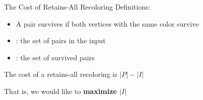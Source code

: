 \begin{frame}{The Cost of Retains-All Recoloring}
Definitions:
\begin{itemize}

\pause\item
A pair \alert{survives} if both vertices with the same color survive

\pause\item
{}: the set of pairs in the input  

\pause\item
{}: the set of survived pairs
 
\end{itemize}

\pause\begin{observation}
The cost of a retains-all recoloring is $|P| - |I|$
\end{observation}

\pause
That is, we would like to \textbf{maximize $|I|$}

\end{frame}